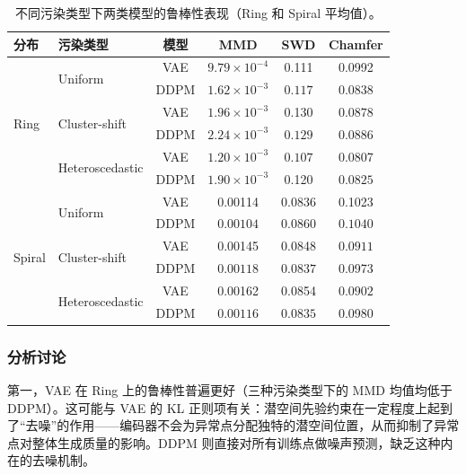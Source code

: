 \documentclass[UTF8,a4paper,12pt]{ctexart}
\begin{document}
\begin{table}[H]
\centering
\footnotesize
\caption{不同污染类型下两类模型的鲁棒性表现（Ring 和 Spiral 平均值）。}
\label{tab:robustness}
\begin{tabular}{llcccc}
\toprule
分布 & 污染类型 & 模型 & MMD  & SWD  & Chamfer  \\
\midrule
\multirow{6}{*}{Ring}
& \multirow{2}{*}{Uniform}
    & VAE    & $\mathbf{9.79}\times 10^{-4}$ & 0.111 & 0.0992 \\
&           & DDPM   & $1.62\times 10^{-3}$ & $\mathbf{0.117}$ & $\mathbf{0.0838}$ \\
\cmidrule{2-5}
& \multirow{2}{*}{Cluster-shift}
    & VAE    & $\mathbf{1.96}\times 10^{-3}$ & 0.130 & $\mathbf{0.0878}$ \\
&           & DDPM   & $2.24\times 10^{-3}$ & $\mathbf{0.129}$ & 0.0886 \\
\cmidrule{2-5}
& \multirow{2}{*}{Heteroscedastic}
    & VAE    & $\mathbf{1.20}\times 10^{-3}$ & $\mathbf{0.107}$ & 0.0807 \\
&           & DDPM   & $1.90\times 10^{-3}$ & 0.120 & $\mathbf{0.0825}$ \\
\midrule
\multirow{6}{*}{Spiral}
& \multirow{2}{*}{Uniform}
    & VAE    & 0.00114 & $\mathbf{0.0836}$ & 0.1023 \\
&           & DDPM   & $\mathbf{0.00104}$ & 0.0860 & $\mathbf{0.1040}$ \\
\cmidrule{2-5}
& \multirow{2}{*}{Cluster-shift}
    & VAE    & 0.00145 & 0.0848 & $\mathbf{0.0911}$ \\
&           & DDPM   & $\mathbf{0.00118}$ & $\mathbf{0.0837}$ & 0.0973 \\
\cmidrule{2-5}
& \multirow{2}{*}{Heteroscedastic}
    & VAE    & 0.00162 & 0.0854 & $\mathbf{0.0902}$ \\
&           & DDPM   & $\mathbf{0.00116}$ & $\mathbf{0.0835}$ & 0.0980 \\
\bottomrule
\end{tabular}
\end{table}

\subsubsection{分析讨论}

第一，VAE 在 Ring 上的鲁棒性普遍更好（三种污染类型下的 MMD 均值均低于 DDPM）。这可能与 VAE 的 KL 正则项有关：潜空间先验约束在一定程度上起到了“去噪”的作用——编码器不会为异常点分配独特的潜空间位置，从而抑制了异常点对整体生成质量的影响。DDPM 则直接对所有训练点做噪声预测，缺乏这种内在的去噪机制。
\end{document}
